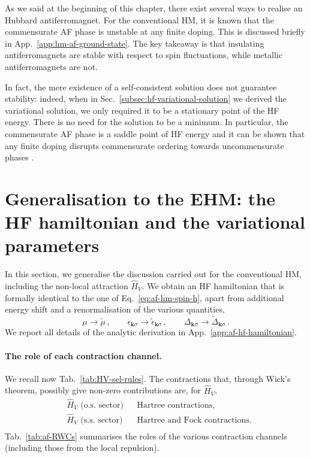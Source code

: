 As we said at the beginning of this chapter, there exist several ways to realise an Hubbard antiferromagnet. For the conventional HM, it is known \cite{singh1990collective,singh1991doped} that the commensurate AF phase is unstable at any finite doping. This is discussed briefly in App.~\ref{app:hm-af-ground-state}. The key takeaway is that insulating antiferromagnets are stable with respect to spin fluctuations, while metallic antiferromagnets are not.

In fact, the mere existence of a self-consistent solution does not guarantee stability: indeed, when in Sec.~\ref{subsec:hf-variational-solution} we derived the variational solution, we only required it to be a stationary point of the HF energy. There is no need for the solution to be a minimum. In particular, the commensurate AF phase is a saddle point of HF energy and it can be shown that any finite doping disrupts commensurate ordering towards uncommensurate phases \cite{singh1990collective}.

\section{Generalisation to the EHM: the HF hamiltonian and the variational parameters}\label{sec:af-hf-hfps}

In this section, we generalise the discussion carried out for the conventional HM, including the non-local attraction $\hat H_V$. We obtain an HF hamiltonian that is formally identical to the one of Eq.~\eqref{eq:af-hm-spin-h}, apart from additional energy shift and a renormalisation of  the various quantities,
\[
	\mu \to \tilde{\mu} \, ,
	\qquad
	\epsilon_{\mathbf{k}\sigma} \to \tilde{\epsilon}_{\mathbf{k}\sigma} \, ,
	\qquad
	\Delta_{\mathbf{k}\sigma} \to \tilde{\Delta}_{\mathbf{k}\sigma} \, .
\]
We report all details of the analytic derivation in App.~\ref{app:af-hf-hamiltonian}.

\paragraph{The role of each contraction channel.}

We recall now Tab.~\ref{tab:HV-sel-rules}. The contractions that, through Wick's theorem, possibly give non-zero contributions are, for $\hat H_V$,
\[
\begin{aligned}
	&\hat H_V \text{ (o.s. sector)}
	&&\text{Hartree contractions,} \\
	&\hat H_V \text{ (s.s. sector)}
	&&\text{Hartree and Fock contractions.} \\
\end{aligned}	
\]
Tab.~\ref{tab:af-RWCs} summarises the roles of the various contraction channels (including those from the local repulsion).

